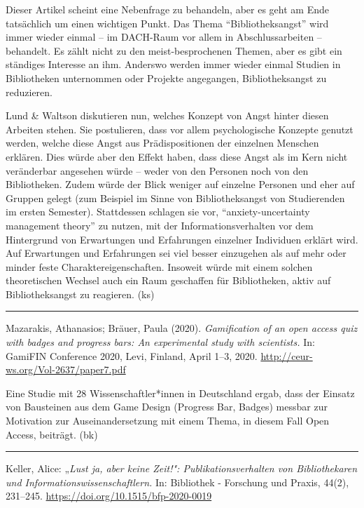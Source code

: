 \documentclass[a4paper,
fontsize=11pt,
oneside,
numbers=noperiodatend,
parskip=half-,
bibliography=totoc,
final
]{scrartcl}
\begin{document}
Dieser Artikel scheint eine Nebenfrage zu behandeln, aber es geht am
Ende tatsächlich um einen wichtigen Punkt. Das Thema
\enquote{Bibliotheksangst} wird immer wieder einmal -- im DACH-Raum vor
allem in Abschlussarbeiten -- behandelt. Es zählt nicht zu den
meist-besprochenen Themen, aber es gibt ein ständiges Interesse an ihm.
Anderswo werden immer wieder einmal Studien in Bibliotheken unternommen
oder Projekte angegangen, Bibliotheksangst zu reduzieren.

Lund \& Waltson diskutieren nun, welches Konzept von Angst hinter diesen
Arbeiten stehen. Sie postulieren, dass vor allem psychologische Konzepte
genutzt werden, welche diese Angst aus Prädispositionen der einzelnen
Menschen erklären. Dies würde aber den Effekt haben, dass diese Angst
als im Kern nicht veränderbar angesehen würde -- weder von den Personen
noch von den Bibliotheken. Zudem würde der Blick weniger auf einzelne
Personen und eher auf Gruppen gelegt (zum Beispiel im Sinne von
Bibliotheksangst von Studierenden im ersten Semester). Stattdessen
schlagen sie vor, \enquote{anxiety-uncertainty management theory} zu
nutzen, mit der Informationsverhalten vor dem Hintergrund von
Erwartungen und Erfahrungen einzelner Individuen erklärt wird. Auf
Erwartungen und Erfahrungen sei viel besser einzugehen als auf mehr oder
minder feste Charaktereigenschaften. Insoweit würde mit einem solchen
theoretischen Wechsel auch ein Raum geschaffen für Bibliotheken, aktiv
auf Bibliotheksangst zu reagieren. (ks)

\begin{center}\rule{0.5\linewidth}{0.5pt}\end{center}

Mazarakis, Athanasios; Bräuer, Paula (2020). \emph{Gamification of an
open access quiz with badges and progress bars: An experimental study
with scientists.} In: GamiFIN Conference 2020, Levi, Finland, April
1--3, 2020. \url{http://ceur-ws.org/Vol-2637/paper7.pdf}

Eine Studie mit 28 Wissenschaftler*innen in Deutschland ergab, dass der
Einsatz von Bausteinen aus dem Game Design (Progress Bar, Badges)
messbar zur Motivation zur Auseinandersetzung mit einem Thema, in diesem
Fall Open Access, beiträgt. (bk)

\begin{center}\rule{0.5\linewidth}{0.5pt}\end{center}

Keller, Alice: „\emph{Lust ja, aber keine Zeit!": Publikationsverhalten
von Bibliothekaren und Informationswissenschaftlern.} In: Bibliothek -
Forschung und Praxis, 44(2), 231--245.
\url{https://doi.org/10.1515/bfp-2020-0019}
\end{document}
